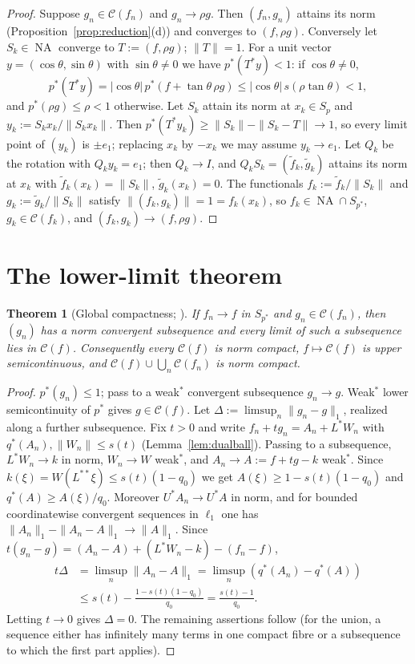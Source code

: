 \documentclass[10pt]{amsart}
\newtheorem{theorem}{Theorem}[section]
\theoremstyle{definition}
\theoremstyle{remark}
\newcommand{\NA}{\operatorname{NA}}
\newcommand{\Cset}{\mathcal C}
\begin{document}
\begin{proof}
Suppose $g_n\in\Cset(f_n)$ and $g_n\to\rho g$.  Then $(f_n,g_n)$ attains
its norm (Proposition~\ref{prop:reduction}(d)) and converges to
$(f,\rho g)$.
Conversely let $S_k\in\NA$ converge to $T:=(f,\rho g)$; $\|T\|=1$.  For a
unit vector $y=(\cos\theta,\sin\theta)$ with $\sin\theta\ne0$ we have
$p^*(T^*y)<1$: if $\cos\theta\ne0$,
\[
 p^*(T^*y)=|\cos\theta|\,p^*(f+\tan\theta\,\rho g)\le|\cos\theta|\,
 s(\rho\tan\theta)<1,
\]
and $p^*(\rho g)\le\rho<1$ otherwise.  Let $S_k$ attain its
norm at $x_k\in S_p$ and $y_k:=S_kx_k/\|S_kx_k\|$.  Then
$p^*(T^*y_k)\ge\|S_k\|-\|S_k-T\|\to1$, so every limit point of $(y_k)$ is
$\pm e_1$; replacing $x_k$ by $-x_k$ we may assume $y_k\to e_1$.  Let $Q_k$
be the rotation with $Q_ky_k=e_1$; then $Q_k\to I$, and $Q_kS_k=(\tilde
f_k,\tilde g_k)$ attains its norm at $x_k$ with $\tilde
f_k(x_k)=\|S_k\|$, $\tilde g_k(x_k)=0$.  The functionals
$f_k:=\tilde f_k/\|S_k\|$ and $g_k:=\tilde g_k/\|S_k\|$ satisfy
$\|(f_k,g_k)\|=1=f_k(x_k)$, so $f_k\in\NA\cap S_{p^*}$, $g_k\in\Cset(f_k)$,
and $(f_k,g_k)\to(f,\rho g)$.
\end{proof}

\section{The lower-limit theorem}\label{sec:lowerlimit}

\begin{theorem}[Global compactness; {\cite{PrA}}]\label{thm:compact}
If $f_n\to f$ in $S_{p^*}$ and $g_n\in\Cset(f_n)$, then $(g_n)$ has a norm
convergent subsequence and every limit of such a subsequence lies in
$\Cset(f)$.  Consequently every $\Cset(f)$ is norm compact, $f\mapsto\Cset(f)$
is upper semicontinuous, and $\Cset(f)\cup\bigcup_n\Cset(f_n)$ is norm
compact.
\end{theorem}

\begin{proof}
$p^*(g_n)\le1$; pass to a weak$^*$ convergent subsequence $g_n\to g$.
Weak$^*$ lower semicontinuity of $p^*$ gives $g\in\Cset(f)$.  Let
$\Delta:=\limsup_n\|g_n-g\|_1$, realized along a further subsequence.  Fix
$t>0$ and write $f_n+tg_n=A_n+L^*W_n$ with $q^*(A_n),\|W_n\|\le s(t)$
(Lemma~\ref{lem:dualball}).  Passing to a subsequence, $L^*W_n\to k$ in
norm, $W_n\to W$ weak$^*$, and $A_n\to A:=f+tg-k$ weak$^*$.  Since
$k(\xi)=W(L^{**}\xi)\le s(t)(1-q_0)$ we get $A(\xi)\ge1-s(t)(1-q_0)$ and
$q^*(A)\ge A(\xi)/q_0$.  Moreover $U^*A_n\to U^*A$ in norm, and for
bounded coordinatewise convergent sequences in $\ell_1$ one has
$\|A_n\|_1-\|A_n-A\|_1\to\|A\|_1$.  Since
$t(g_n-g)=(A_n-A)+(L^*W_n-k)-(f_n-f)$,
\begin{align*}
 t\Delta&=\limsup_n\|A_n-A\|_1=\limsup_n(q^*(A_n)-q^*(A))\\
 &\le s(t)-\frac{1-s(t)(1-q_0)}{q_0}=\frac{s(t)-1}{q_0}.
\end{align*}
Letting $t\to0$ gives $\Delta=0$.  The remaining assertions follow
(for the union, a sequence either has infinitely many terms in one compact
fibre or a subsequence to which the first part applies).
\end{proof}
\end{document}

